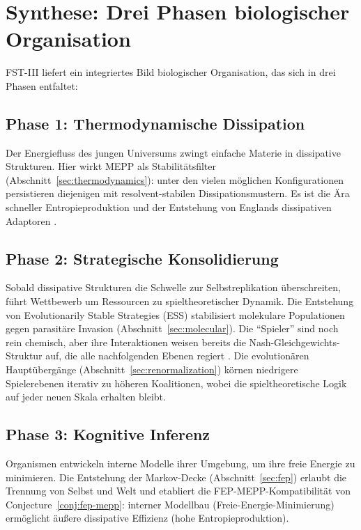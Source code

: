 \documentclass[12pt,a4paper]{article}
\theoremstyle{remark}
\begin{document}
\section{Synthese: Drei Phasen biologischer Organisation}
\label{sec:synthesis}

FST-III liefert ein integriertes Bild biologischer Organisation, das sich in drei Phasen entfaltet:

\subsection{Phase 1: Thermodynamische Dissipation}

Der Energiefluss des jungen Universums zwingt einfache Materie in dissipative Strukturen. Hier wirkt MEPP als Stabilit\"atsfilter (Abschnitt~\ref{sec:thermodynamics}): unter den vielen m\"oglichen Konfigurationen persistieren diejenigen mit resolvent-stabilen Dissipationsmustern. Es ist die \"Ara schneller Entropieproduktion und der Entstehung von Englands dissipativen Adaptoren \citep{EcosystemMEPP}.

\subsection{Phase 2: Strategische Konsolidierung}

Sobald dissipative Strukturen die Schwelle zur Selbstreplikation \"uberschreiten, f\"uhrt Wettbewerb um Ressourcen zu spieltheoretischer Dynamik. Die Entstehung von Evolutionarily Stable Strategies (ESS) stabilisiert molekulare Populationen gegen parasit\"are Invasion (Abschnitt~\ref{sec:molecular}). Die ``Spieler'' sind noch rein chemisch, aber ihre Interaktionen weisen bereits die Nash-Gleichgewichts-Struktur auf, die alle nachfolgenden Ebenen regiert \citep{MaynardSmithPrice1973}. Die evolution\"aren Haupt\"uberg\"ange (Abschnitt~\ref{sec:renormalization}) k\"ornen niedrigere Spielerebenen iterativ zu h\"oheren Koalitionen, wobei die spieltheoretische Logik auf jeder neuen Skala erhalten bleibt.

\subsection{Phase 3: Kognitive Inferenz}

Organismen entwickeln interne Modelle ihrer Umgebung, um ihre freie Energie zu minimieren. Die Entstehung der Markov-Decke (Abschnitt~\ref{sec:fep}) erlaubt die Trennung von Selbst und Welt und etabliert die FEP-MEPP-Kompatibilit\"at von Conjecture~\ref{conj:fep-mepp}: interner Modellbau (Freie-Energie-Minimierung) erm\"oglicht \"au\ss{}ere dissipative Effizienz (hohe Entropieproduktion).
\end{document}
